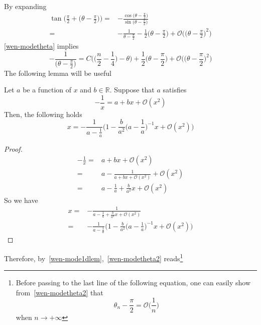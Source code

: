 By expanding
\begin{equation*}
\begin{split}
\tan\Big(\frac{\pi}{2} + \big(\theta - \frac \pi 2 \big) \Big) = &
- \frac{\cos\big(\theta-\frac{\pi}{2}\big)}{\sin\big(\theta-\frac{\pi}{2}\big)} \\
= & 
-\frac{1}{\theta - \frac \pi 2 } - \frac{1}{2}\big(\theta - \frac{\pi}{2}\big) + \mathcal{O}\Big(\big(\theta - \frac \pi 2 \big)^2\Big)
\end{split}
\end{equation*}
\cref{wen-modetheta} implies
\begin{equation}\label{wen-modetheta2}
-\frac{1}{\big(\theta - \frac \pi 2\big)} = 
C\Big( \big(\frac n 2 -\frac 1 4 \big) - \theta \Big) +  \frac{1}{2}\big(\theta - \frac{\pi}{2}\big) + \mathcal{O}\Big(\big(\theta - \frac \pi 2 \big)^2\Big)
\end{equation}
The following lemma will be useful
\begin{lemma}\label{wen-mode1dlem}
Let $a$ be a function of $x$ and $b \in\mathbb{R}$.
Suppose that $a $ satisfies
\begin{equation*}
-\frac 1 x = a + bx + \mathcal{O}(x^2)
\end{equation*}
Then, the following holds
\begin{equation*}
x = -\frac{1}{a-\frac 1 a}\Big( 1 - \frac{b}{a^2}\big(a-\frac 1 a\big)^{-1}x + \mathcal{O}(x^2)\Big)
\end{equation*}
\end{lemma}
\begin{proof}
\begin{equation*}
\begin{split}
-\frac 1 x  = & a + bx + \mathcal{O}(x^2) \\ 
=& a - \frac{1}{a+bx + \mathcal{O}(x^2)} + \mathcal{O}(x^2) \\
= & a - \frac 1 a + \frac{b}{a^2}x + \mathcal{O}(x^2)
\end{split}
\end{equation*}
So we have
\begin{equation*}
\begin{split}
x = & -\frac{1}{a - \frac 1 a + \frac{b}{a^2}x + \mathcal{O}(x^2)} \\
=& -\frac{1}{a-\frac 1 a}\Big( 1 - \frac{b}{a^2}\big(a-\frac 1 a\big)^{-1}x + \mathcal{O}(x^2)\Big)
\end{split}
\end{equation*}
\end{proof}
Therefore, by~\cref{wen-mode1dlem},~\cref{wen-modetheta2} reads\footnote{
Before passing to the last line of the following equation, one can easily show from~\cref{wen-modetheta2} that 
\begin{equation*}
\theta_n - \frac \pi 2 = \mathcal{O}\big(\frac{1}{n}\big)
\end{equation*}
when $n\rightarrow +\infty$
}
